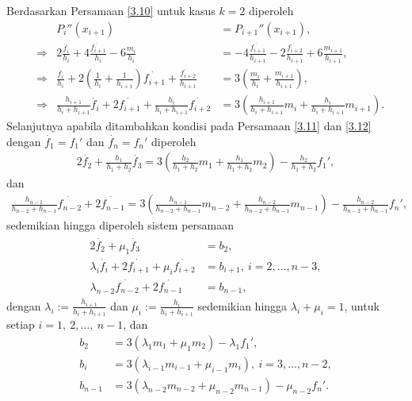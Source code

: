 Berdasarkan Persamaan \eqref{3.10} untuk kasus $k=2$ diperoleh
\begin{align*}
        &&P_i''(x_{i+1}) &= P_{i+1}''(x_{i+1}), \\
        &\Rightarrow& 
        2\frac{\dot{f_i}}{h_i} + 4\frac{\dot{f_{i+1}}}{h_i} - 6\frac{m_i}{h_i} &= -4\frac{\dot{f_{i+1}}}{h_{i+1}} - 2\frac{\dot{f_{i+2}}}{h_{i+1}} + 6\frac{m_{i+1}}{h_{i+1}}, \\
        &\Rightarrow&
        \frac{\dot{f_i}}{h_i} + 2\left( \frac{1}{h_i} + \frac{1}{h_{i+1}} \right)\dot{f_{i+1}} + \frac{\dot{f_{i+2}}}{h_{i+1}} &= 3\left( \frac{m_i}{h_i} + \frac{m_{i+1}}{h_{i+1}} \right),\\
        &\Rightarrow&\frac{h_{i+1}}{h_i + h_{i+1}}\dot{f_i} + 2\dot{f_{i+1}} + \frac{h_i}{h_i + h_{i+1}}\dot{f_{i+2}} &= 3\left( \frac{h_{i+1}}{h_i + h_{i+1}}m_i + \frac{h_i}{h_i + h_{i+1}}m_{i+1} \right).
\end{align*}
Selanjutnya apabila ditambahkan kondisi pada Persamaan \eqref{3.11} dan \eqref{3.12} dengan $\dot{f_1} = f_1'$ dan $\dot{f_n} = f_n'$ diperoleh
\begin{align*}
2\dot{f_{2}} + \frac{h_1}{h_1 + h_{2}}\dot{f_{3}} = 3\left( \frac{h_{2}}{h_1 + h_{2}}m_1 + \frac{h_1}{h_1 + h_{2}}m_{2} \right) - \frac{h_{2}}{h_1 + h_{2}}f_1',
\end{align*}
dan
\begin{align*}
\frac{h_{n-1}}{h_{n-2} + h_{n-1}}\dot{f_{n-2}} + 2\dot{f_{n-1}} = 3\left( \frac{h_{n-1}}{h_{n-2} + h_{n-1}}m_{n-2} + \frac{h_{n-2}}{h_{n-2} + h_{n-1}}m_{n-1} \right) - \frac{h_{n-2}}{h_{n-2} + h_{n-1}}f_{n}',
\end{align*}
sedemikian hingga diperoleh sistem persamaan
\begin{gather}\label{3.14}
    \begin{split}
    2\dot{f_2} + \mu_1\dot{f_3} &= b_2, \\
    \lambda_i\dot{f_i} + 2\dot{f_{i+1}} + \mu_i\dot{f_{i+2}} &= b_{i+1}, \: i=2,\dots,n-3, \\
    \lambda_{n-2}\dot{f_{n-2}} + 2\dot{f_{n-1}} &= b_{n-1},
    \end{split}
\end{gather}
dengan $\lambda_i := \frac{h_{i+1}}{h_i+h_{i+1}}$ dan $ \mu_i := \frac{h_i}{h_i+h_{i+1}}$ sedemikian hingga $ \lambda_i + \mu_i = 1$, untuk setiap $ i=1,~2,\dots,~n-1$, dan
\begin{align*}
    b_2 &= 3(\lambda_1m_1 + \mu_1m_2) - \lambda_1f_1',\\
    b_i &= 3(\lambda_{i-1}m_{i-1} + \mu_{i-1}m_i), \: i=3,\dots,n-2,\\
    b_{n-1} &= 3(\lambda_{n-2}m_{n-2} + \mu_{n-2}m_{n-1}) - \mu_{n-2}f_n'.
\end{align*}
